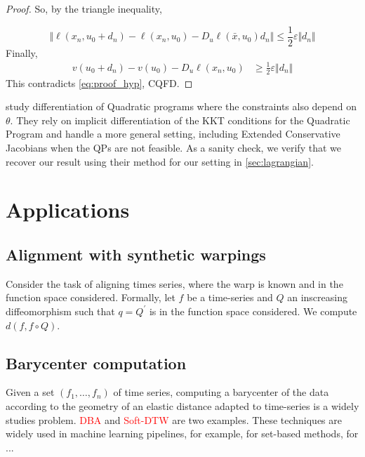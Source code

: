 \begin{proof}
    So, by the triangle inequality,

    \begin{equation}
       \Vert \ell(x_n, u_0 + d_n) - \ell(x_n, u_0) - D_u \ell(\bar x, u_0)d_n\Vert \leq \frac{1}{2} \varepsilon \Vert d_n \Vert
    \end{equation}
    Finally,
    \begin{align}
        v(u_0 + d_n) - v(u_0) - D_u \ell(x_n, u_0)&\geq\frac{1}{2}\varepsilon\Vert d_n\Vert
    \end{align}
    This contradicts \cref{eq:proof_hyp}, CQFD.
\end{proof}

\begin{remark}
    \cite{bambade,optnet,...} study differentiation of Quadratic programs where the constraints also depend on $\theta$. They rely on implicit differentiation of the KKT conditions for the Quadratic Program and handle a more general setting, including Extended Conservative Jacobians when the QPs are not feasible. As a sanity check, we verify that we recover our result using their method for our setting in \cref{sec:lagrangian}.


\end{remark}

\section{Applications}

\subsection{Alignment with synthetic warpings}

Consider the task of aligning times series, where the warp is known and in the function space considered. Formally, let $f$ be a time-series and $Q$ an inscreasing diffeomorphism such that $q = Q^\prime$ is in the function space considered. We compute $d(f, f\circ Q)$.

\subsection{Barycenter computation}
Given a set $(f_1, \ldots, f_n)$ of time series, computing a barycenter of the data according to the geometry of an elastic distance adapted to time-series is a widely studies problem. \textcolor{red}{DBA} and \textcolor{red}{Soft-DTW} are two examples. These techniques are widely used in machine learning pipelines, for example, for set-based methods, for ...

